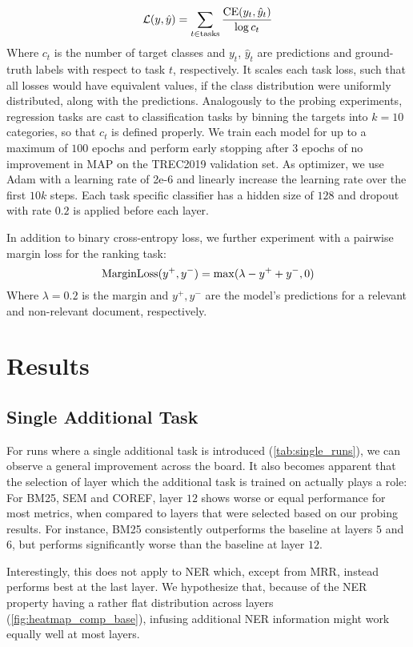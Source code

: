 \begin{equation}
    \mathcal{L}(y, \hat{y}) = \sum_{t \in \text{tasks}} \frac{\textnormal{CE}(y_t, \hat{y}_t)}{\log c_t}
\end{equation}
Where $c_t$ is the number of target classes and $y_t$, $\hat{y}_t$ are predictions and ground-truth labels with respect to task $t$, respectively. It scales each task loss, such that all losses would have equivalent values, if the class distribution were uniformly distributed, along with the predictions. Analogously to the probing experiments, regression tasks are cast to classification tasks by binning the targets into $k=10$ categories, so that $c_t$ is defined properly.
We train each model for up to a maximum of $100$ epochs and perform early stopping after $3$ epochs of no improvement in MAP on the TREC2019 validation set. As optimizer, we use Adam\cite{kingma2014adam} with a learning rate of 2e-6 and linearly increase the learning rate over the first $10k$ steps. Each task specific classifier has a hidden size of $128$ and dropout with rate $0.2$ is applied before each layer.

In addition to binary cross-entropy loss, we further experiment with a pairwise margin loss for the ranking task:
\begin{equation}
    \text{MarginLoss}(y^+, y^-) = \max(\lambda - y^+ + y^-, 0)
\end{equation}
Where $\lambda=0.2$ is the margin and $y^+, y^-$ are the model's predictions for a relevant and non-relevant document, respectively.

\section{Results}
\subsection{Single Additional Task}
For runs where a single additional task is introduced (\autoref{tab:single_runs}), we can observe a general improvement across the board. It also becomes apparent that the selection of layer which the additional task is trained on actually plays a role: For BM25, SEM and COREF, layer $12$ shows worse or equal performance for most metrics, when compared to layers that were selected based on our probing results. For instance, BM25 consistently outperforms the baseline at layers $5$ and $6$, but performs significantly worse than the baseline at layer $12$.

Interestingly, this does not apply to NER which, except from MRR, instead performs best at the last layer. We hypothesize that, because of the NER property having a rather flat distribution across layers (\autoref{fig:heatmap_comp_base}), infusing additional NER information might work equally well at most layers.


